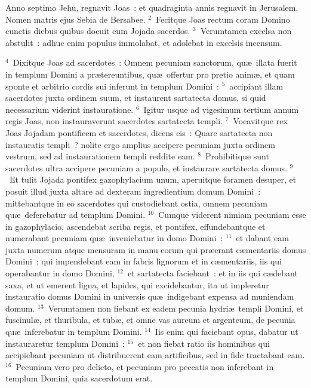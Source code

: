 \bchapter
\lettrine[lines=3,image=true,loversize=0.05,lraise=-0.03]{A}{}nno septimo Jehu, regnavit Joas~: et quadraginta annis regnavit in Jerusalem. Nomen matris ejus Sebia de Bersabee.
${}^{2}$~Fecitque Joas rectum coram Domino cunctis diebus quibus docuit eum Jojada sacerdos.
${}^{3}$~Verumtamen excelsa non abstulit~: adhuc enim populus immolabat, et adolebat in excelsis incensum.


${}^{4}$~Dixitque Joas ad sacerdotes~: Omnem pecuniam sanctorum, qu\ae\ illata fuerit in templum Domini a pr\ae tereuntibus, qu\ae\ offertur pro pretio anim\ae , et quam sponte et arbitrio cordis sui inferunt in templum Domini~:
${}^{5}$~accipiant illam sacerdotes juxta ordinem suum, et instaurent sartatecta domus, si quid necessarium viderint instauratione.
${}^{6}$~Igitur usque ad vigesimum tertium annum regis Joas, non instauraverunt sacerdotes sartatecta templi.
${}^{7}$~Vocavitque rex Joas Jojadam pontificem et sacerdotes, dicens eis~: Quare sartatecta non instauratis templi~? nolite ergo amplius accipere pecuniam juxta ordinem vestrum, sed ad instaurationem templi reddite eam.
${}^{8}$~Prohibitique sunt sacerdotes ultra accipere pecuniam a populo, et instaurare sartatecta domus.
${}^{9}$~Et tulit Jojada pontifex gazophylacium unum, aperuitque foramen desuper, et posuit illud juxta altare ad dexteram ingredientium domum Domini~: mittebantque in eo sacerdotes qui custodiebant ostia, omnem pecuniam qu\ae\ deferebatur ad templum Domini.
${}^{10}$~Cumque viderent nimiam pecuniam esse in gazophylacio, ascendebat scriba regis, et pontifex, effundebantque et numerabant pecuniam qu\ae\ inveniebatur in domo Domini~:
${}^{11}$~et dabant eam juxta numerum atque mensuram in manu eorum qui pr\ae erant c\ae mentariis domus Domini~: qui impendebant eam in fabris lignorum et in c\ae mentariis, iis qui operabantur in domo Domini,
${}^{12}$~et sartatecta faciebant~: et in iis qui c\ae debant saxa, et ut emerent ligna, et lapides, qui excidebantur, ita ut impleretur instauratio domus Domini in universis qu\ae\ indigebant expensa ad muniendam domum.
${}^{13}$~Verumtamen non fiebant ex eadem pecunia hydri\ae\ templi Domini, et fuscinul\ae , et thuribula, et tub\ae , et omne vas aureum et argenteum, de pecunia qu\ae\ inferebatur in templum Domini.
${}^{14}$~Iis enim qui faciebant opus, dabatur ut instauraretur templum Domini~:
${}^{15}$~et non fiebat ratio iis hominibus qui accipiebant pecuniam ut distribuerent eam artificibus, sed in fide tractabant eam.
${}^{16}$~Pecuniam vero pro delicto, et pecuniam pro peccatis non inferebant in templum Domini, quia sacerdotum erat.


